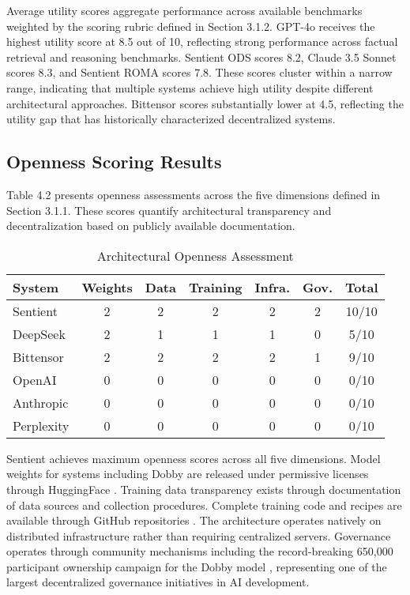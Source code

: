 Average utility scores aggregate performance across available benchmarks weighted by the scoring rubric defined in Section 3.1.2. GPT-4o receives the highest utility score at 8.5 out of 10, reflecting strong performance across factual retrieval and reasoning benchmarks. Sentient ODS scores 8.2, Claude 3.5 Sonnet scores 8.3, and Sentient ROMA scores 7.8. These scores cluster within a narrow range, indicating that multiple systems achieve high utility despite different architectural approaches. Bittensor scores substantially lower at 4.5, reflecting the utility gap that has historically characterized decentralized systems.

\subsection{Openness Scoring Results}

Table 4.2 presents openness assessments across the five dimensions defined in Section 3.1.1. These scores quantify architectural transparency and decentralization based on publicly available documentation.

\begin{table}[h]
\centering
\caption{Architectural Openness Assessment}
\begin{tabular}{lcccccc}
\toprule
\textbf{System} & \textbf{Weights} & \textbf{Data} & \textbf{Training} & \textbf{Infra.} & \textbf{Gov.} & \textbf{Total} \\
\midrule
Sentient    & 2 & 2 & 2 & 2 & 2 & 10/10 \\
DeepSeek    & 2 & 1 & 1 & 1 & 0 & 5/10 \\
Bittensor   & 2 & 2 & 2 & 2 & 1 & 9/10 \\
OpenAI      & 0 & 0 & 0 & 0 & 0 & 0/10 \\
Anthropic   & 0 & 0 & 0 & 0 & 0 & 0/10 \\
Perplexity  & 0 & 0 & 0 & 0 & 0 & 0/10 \\
\bottomrule
\end{tabular}
\label{tab:openness_scores}
\end{table}

Sentient achieves maximum openness scores across all five dimensions. Model weights for systems including Dobby are released under permissive licenses through HuggingFace \cite{dobby_huggingface2025}. Training data transparency exists through documentation of data sources and collection procedures. Complete training code and recipes are available through GitHub repositories \cite{ods_github2025, roma_github2025}. The architecture operates natively on distributed infrastructure rather than requiring centralized servers. Governance operates through community mechanisms including the record-breaking 650,000 participant ownership campaign for the Dobby model \cite{dobby2025}, representing one of the largest decentralized governance initiatives in AI development.

